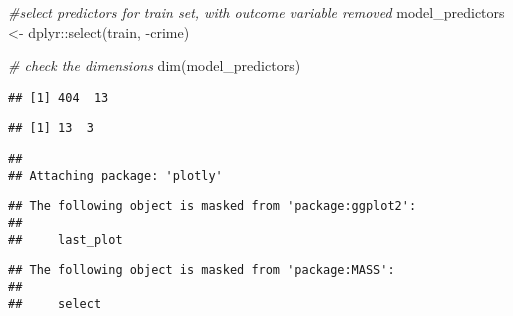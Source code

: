 \documentclass[
]{article}
\newenvironment{Shaded}{\begin{snugshade}}{\end{snugshade}}
\newcommand{\CommentTok}[1]{\textcolor[rgb]{0.56,0.35,0.01}{\textit{#1}}}
\newcommand{\FunctionTok}[1]{\textcolor[rgb]{0.00,0.00,0.00}{#1}}
\newcommand{\NormalTok}[1]{#1}
\newcommand{\OtherTok}[1]{\textcolor[rgb]{0.56,0.35,0.01}{#1}}
\newcommand{\SpecialCharTok}[1]{\textcolor[rgb]{0.00,0.00,0.00}{#1}}
\begin{document}
\begin{Shaded}
\begin{Highlighting}[]
\CommentTok{\#select predictors for train set, with outcome variable removed}
\NormalTok{model\_predictors }\OtherTok{\textless{}{-}}\NormalTok{ dplyr}\SpecialCharTok{::}\FunctionTok{select}\NormalTok{(train, }\SpecialCharTok{{-}}\NormalTok{crime)}

\CommentTok{\# check the dimensions}
\FunctionTok{dim}\NormalTok{(model\_predictors)}
\end{Highlighting}
\end{Shaded}

\begin{verbatim}
## [1] 404  13
\end{verbatim}

\begin{Shaded}
\end{Shaded}

\begin{verbatim}
## [1] 13  3
\end{verbatim}

\begin{Shaded}
\end{Shaded}

\begin{verbatim}
## 
## Attaching package: 'plotly'
\end{verbatim}

\begin{verbatim}
## The following object is masked from 'package:ggplot2':
## 
##     last_plot
\end{verbatim}

\begin{verbatim}
## The following object is masked from 'package:MASS':
## 
##     select
\end{verbatim}
\end{document}
